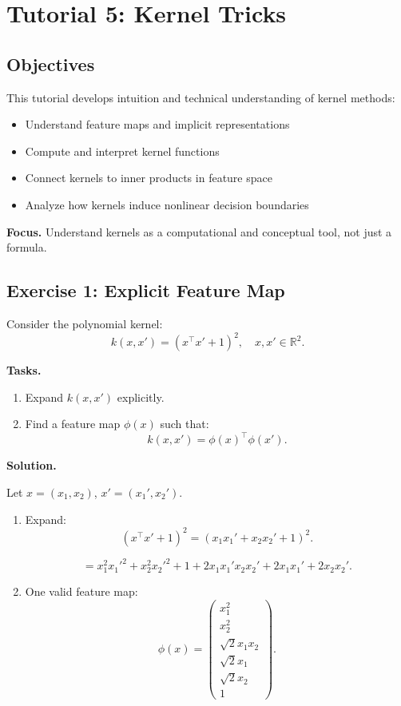 \section{Tutorial 5: Kernel Tricks}

\subsection{Objectives}

This tutorial develops intuition and technical understanding of kernel methods:

\begin{itemize}
    \item Understand feature maps and implicit representations
    \item Compute and interpret kernel functions
    \item Connect kernels to inner products in feature space
    \item Analyze how kernels induce nonlinear decision boundaries
\end{itemize}

\medskip

\noindent
\textbf{Focus.}  
Understand kernels as a computational and conceptual tool, not just a formula.

\subsection{Exercise 1: Explicit Feature Map}

Consider the polynomial kernel:
\[
k(x, x') = (x^\top x' + 1)^2, \quad x, x' \in \mathbb{R}^2.
\]

\medskip

\noindent
\textbf{Tasks.}
\begin{enumerate}
    \item Expand $k(x,x')$ explicitly.
    \item Find a feature map $\phi(x)$ such that:
    \[
    k(x,x') = \phi(x)^\top \phi(x').
    \]
\end{enumerate}

\medskip

\noindent
\textbf{Solution.}

Let $x = (x_1, x_2)$, $x' = (x_1', x_2')$.

\begin{enumerate}
\item Expand:
\[
(x^\top x' + 1)^2 =
(x_1 x_1' + x_2 x_2' + 1)^2.
\]

\[
= x_1^2 x_1'^2 + x_2^2 x_2'^2 + 1
+ 2 x_1 x_1' x_2 x_2'
+ 2 x_1 x_1' + 2 x_2 x_2'.
\]

\item One valid feature map:
\[
\phi(x) =
\begin{pmatrix}
x_1^2 \\
x_2^2 \\
\sqrt{2} x_1 x_2 \\
\sqrt{2} x_1 \\
\sqrt{2} x_2 \\
1
\end{pmatrix}.
\]
\end{enumerate}

